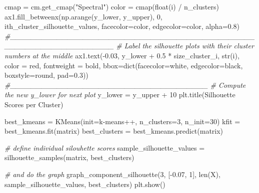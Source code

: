 \documentclass[]{tufte-book}
\newenvironment{Shaded}{}{}
\newcommand{\BuiltInTok}[1]{#1}
\newcommand{\CommentTok}[1]{\textcolor[rgb]{0.38,0.63,0.69}{\textit{#1}}}
\newcommand{\DecValTok}[1]{\textcolor[rgb]{0.25,0.63,0.44}{#1}}
\newcommand{\FloatTok}[1]{\textcolor[rgb]{0.25,0.63,0.44}{#1}}
\newcommand{\NormalTok}[1]{#1}
\newcommand{\OperatorTok}[1]{\textcolor[rgb]{0.40,0.40,0.40}{#1}}
\newcommand{\StringTok}[1]{\textcolor[rgb]{0.25,0.44,0.63}{#1}}
\theoremstyle{definition}
\theoremstyle{definition}
\theoremstyle{definition}
\theoremstyle{remark}
\begin{document}
\begin{Shaded}
\begin{Highlighting}[]
\NormalTok{        cmap }\OperatorTok{=}\NormalTok{ cm.get\_cmap(}\StringTok{"Spectral"}\NormalTok{)}
\NormalTok{        color }\OperatorTok{=}\NormalTok{ cmap(}\BuiltInTok{float}\NormalTok{(i) }\OperatorTok{/}\NormalTok{ n\_clusters)}
\NormalTok{        ax1.fill\_betweenx(np.arange(y\_lower, y\_upper), }\DecValTok{0}\NormalTok{,    ith\_cluster\_silhouette\_values,}
\NormalTok{         facecolor}\OperatorTok{=}\NormalTok{color, edgecolor}\OperatorTok{=}\NormalTok{color, alpha}\OperatorTok{=}\FloatTok{0.8}\NormalTok{)}
        \CommentTok{\#\_\_\_\_\_\_\_\_\_\_\_\_\_\_\_\_\_\_\_\_\_\_\_\_\_\_\_\_\_\_\_\_\_\_\_\_\_\_\_\_\_\_\_\_\_\_\_\_\_\_\_\_\_\_\_\_\_\_\_\_\_\_\_\_\_\_\_\_}
        \CommentTok{\# Label the silhouette plots with their cluster numbers at the middle}
\NormalTok{        ax1.text(}\OperatorTok{{-}}\FloatTok{0.03}\NormalTok{, y\_lower }\OperatorTok{+} \FloatTok{0.5} \OperatorTok{*}\NormalTok{ size\_cluster\_i, }\BuiltInTok{str}\NormalTok{(i), color }\OperatorTok{=} \StringTok{\textquotesingle{}red\textquotesingle{}}\NormalTok{, fontweight }\OperatorTok{=} \StringTok{\textquotesingle{}bold\textquotesingle{}}\NormalTok{,}
\NormalTok{                bbox}\OperatorTok{=}\BuiltInTok{dict}\NormalTok{(facecolor}\OperatorTok{=}\StringTok{\textquotesingle{}white\textquotesingle{}}\NormalTok{, edgecolor}\OperatorTok{=}\StringTok{\textquotesingle{}black\textquotesingle{}}\NormalTok{, boxstyle}\OperatorTok{=}\StringTok{\textquotesingle{}round, pad=0.3\textquotesingle{}}\NormalTok{))}
        \CommentTok{\#\_\_\_\_\_\_\_\_\_\_\_\_\_\_\_\_\_\_\_\_\_\_\_\_\_\_\_\_\_\_\_\_\_\_\_\_\_\_}
        \CommentTok{\# Compute the new y\_lower for next plot}
\NormalTok{        y\_lower }\OperatorTok{=}\NormalTok{ y\_upper }\OperatorTok{+} \DecValTok{10}
\NormalTok{    plt.title(}\StringTok{\textquotesingle{}Silhouette Scores per Cluster\textquotesingle{}}\NormalTok{)}

\NormalTok{best\_kmeans }\OperatorTok{=}\NormalTok{ KMeans(init}\OperatorTok{=}\StringTok{\textquotesingle{}k{-}means++\textquotesingle{}}\NormalTok{, n\_clusters}\OperatorTok{=}\DecValTok{3}\NormalTok{, n\_init}\OperatorTok{=}\DecValTok{30}\NormalTok{)}
\NormalTok{kfit }\OperatorTok{=}\NormalTok{ best\_kmeans.fit(matrix)}
\NormalTok{best\_clusters }\OperatorTok{=}\NormalTok{ best\_kmeans.predict(matrix)}

\CommentTok{\# define individual silouhette scores}
\NormalTok{sample\_silhouette\_values }\OperatorTok{=}\NormalTok{ silhouette\_samples(matrix, best\_clusters)}

\CommentTok{\# and do the graph}
\NormalTok{graph\_component\_silhouette(}\DecValTok{3}\NormalTok{, [}\OperatorTok{{-}}\FloatTok{0.07}\NormalTok{, }\DecValTok{1}\NormalTok{], }\BuiltInTok{len}\NormalTok{(X), sample\_silhouette\_values, best\_clusters)}
\NormalTok{plt.show()}
\end{Highlighting}
\end{Shaded}
\end{document}
